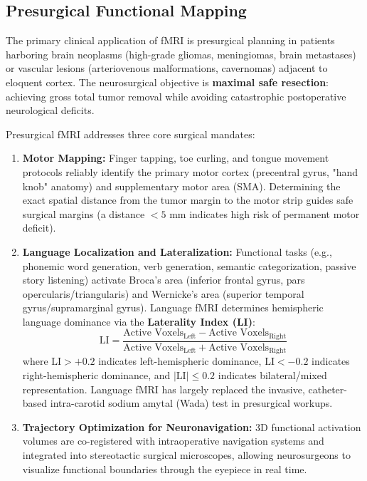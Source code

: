 \documentclass[11pt,a4paper]{article}
\begin{document}
\subsection{Presurgical Functional Mapping}
The primary clinical application of fMRI is presurgical planning in patients harboring brain neoplasms (high-grade gliomas, meningiomas, brain metastases) or vascular lesions (arteriovenous malformations, cavernomas) adjacent to eloquent cortex. The neurosurgical objective is \textbf{maximal safe resection}: achieving gross total tumor removal while avoiding catastrophic postoperative neurological deficits.

\begin{clinicalpearl}
Presurgical fMRI addresses three core surgical mandates:
\begin{enumerate}
    \item \textbf{Motor Mapping:} Finger tapping, toe curling, and tongue movement protocols reliably identify the primary motor cortex (precentral gyrus, "hand knob" anatomy) and supplementary motor area (SMA). Determining the exact spatial distance from the tumor margin to the motor strip guides safe surgical margins (a distance $< 5\text{ mm}$ indicates high risk of permanent motor deficit).
    \item \textbf{Language Localization and Lateralization:} Functional tasks (e.g., phonemic word generation, verb generation, semantic categorization, passive story listening) activate Broca's area (inferior frontal gyrus, pars opercularis/triangularis) and Wernicke's area (superior temporal gyrus/supramarginal gyrus). Language fMRI determines hemispheric language dominance via the \textbf{Laterality Index (LI)}:
    \begin{equation}
        \text{LI} = \frac{\text{Active Voxels}_{\text{Left}} - \text{Active Voxels}_{\text{Right}}}{\text{Active Voxels}_{\text{Left}} + \text{Active Voxels}_{\text{Right}}}
    \end{equation}
    where $\text{LI} > +0.2$ indicates left-hemispheric dominance, $\text{LI} < -0.2$ indicates right-hemispheric dominance, and $|\text{LI}| \le 0.2$ indicates bilateral/mixed representation. Language fMRI has largely replaced the invasive, catheter-based intra-carotid sodium amytal (Wada) test in presurgical workups.
    \item \textbf{Trajectory Optimization for Neuronavigation:} 3D functional activation volumes are co-registered with intraoperative navigation systems and integrated into stereotactic surgical microscopes, allowing neurosurgeons to visualize functional boundaries through the eyepiece in real time.
\end{enumerate}
\end{clinicalpearl}
\end{document}
